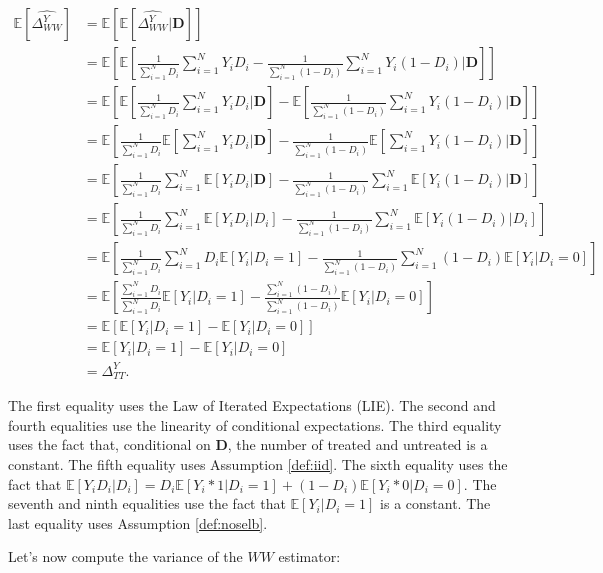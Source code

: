 \documentclass[]{book}
\newcommand{\esp}[1]{\mathbb{E}[ #1 ]}
\theoremstyle{definition}
\theoremstyle{definition}
\theoremstyle{definition}
\theoremstyle{remark}
\begin{document}
\begin{align*}
\esp{\hat{\Delta^Y_{WW}}} & = \esp{\esp{\hat{\Delta^Y_{WW}}|\mathbf{D}}}\\
                          & = \esp{\esp{\frac{1}{\sum_{i=1}^N D_i}\sum_{i=1}^N Y_iD_i-\frac{1}{\sum_{i=1}^N (1-D_i)}\sum_{i=1}^N Y_i(1-D_i)|\mathbf{D}}}\\
                          & = \esp{\esp{\frac{1}{\sum_{i=1}^N D_i}\sum_{i=1}^N Y_iD_i|\mathbf{D}}-\esp{\frac{1}{\sum_{i=1}^N (1-D_i)}\sum_{i=1}^N Y_i(1-D_i)|\mathbf{D}}}\\
                          & = \esp{\frac{1}{\sum_{i=1}^N D_i}\esp{\sum_{i=1}^N Y_iD_i|\mathbf{D}}-\frac{1}{\sum_{i=1}^N (1-D_i)}\esp{\sum_{i=1}^N Y_i(1-D_i)|\mathbf{D}}}\\
                          & = \esp{\frac{1}{\sum_{i=1}^N D_i}\sum_{i=1}^N \esp{Y_iD_i|\mathbf{D}}-\frac{1}{\sum_{i=1}^N (1-D_i)}\sum_{i=1}^N \esp{Y_i(1-D_i)|\mathbf{D}}}\\
                          & = \esp{\frac{1}{\sum_{i=1}^N D_i}\sum_{i=1}^N \esp{Y_iD_i|D_i}-\frac{1}{\sum_{i=1}^N (1-D_i)}\sum_{i=1}^N \esp{Y_i(1-D_i)|D_i}}\\
                          & = \esp{\frac{1}{\sum_{i=1}^N D_i}\sum_{i=1}^N D_i\esp{Y_i|D_i=1}-\frac{1}{\sum_{i=1}^N (1-D_i)}\sum_{i=1}^N(1-D_i)\esp{Y_i|D_i=0}}\\
                          & = \esp{\frac{\sum_{i=1}^N D_i}{\sum_{i=1}^N D_i}\esp{Y_i|D_i=1}-\frac{\sum_{i=1}^N(1-D_i)}{\sum_{i=1}^N (1-D_i)}\esp{Y_i|D_i=0}}\\
                          & = \esp{\esp{Y_i|D_i=1}-\esp{Y_i|D_i=0}}\\
                          & = \esp{Y_i|D_i=1}-\esp{Y_i|D_i=0} \\
                          & = \Delta^Y_{TT}.
\end{align*}

The first equality uses the Law of Iterated Expectations (LIE).
The second and fourth equalities use the linearity of conditional expectations.
The third equality uses the fact that, conditional on \(\mathbf{D}\), the number of treated and untreated is a constant.
The fifth equality uses Assumption \ref{def:iid}.
The sixth equality uses the fact that \(\esp{Y_iD_i|D_i}=D_i\esp{Y_i*1|D_i=1}+(1-D_i)\esp{Y_i*0|D_i=0}\).
The seventh and ninth equalities use the fact that \(\esp{Y_i|D_i=1}\) is a constant.
The last equality uses Assumption \ref{def:noselb}.

Let's now compute the variance of the \(WW\) estimator:
\end{document}
